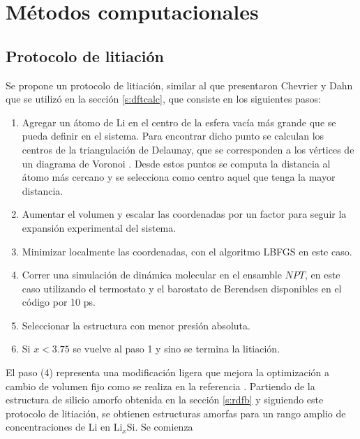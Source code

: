 \section{Métodos computacionales}

\subsection{Protocolo de litiación}\label{s:litpro}

Se propone un protocolo de litiación, similar al que presentaron Chevrier y Dahn
\cite{chevrier2009} que se utilizó en la sección \ref{s:dftcalc}, que consiste 
en los siguientes pasos:
\begin{enumerate}
    \item Agregar un átomo de Li en el centro de la esfera vacía más grande que se pueda definir en el sistema.
        Para encontrar dicho punto se calculan los centros de la triangulación 
        de Delaunay, que se corresponden a los vértices de un diagrama de 
        Voronoi \cite{aurenhammer1991}. Desde estos puntos se computa la 
        distancia al átomo más cercano y se selecciona como centro aquel que 
        tenga la mayor distancia. 
    \item Aumentar  el volumen y escalar las coordenadas por un factor para
        seguir la expansión experimental del sistema.
    \item Minimizar localmente las coordenadas, con el algoritmo LBFGS \cite{liu1989} en este caso.
    \item Correr una simulación de dinámica molecular en el ensamble $NPT$, en 
        este caso utilizando el termostato y el barostato de Berendsen \cite{berendsen1984} 
        disponibles en el código  \cite{dftb+} por 10 ps. 
    \item Seleccionar la estructura con menor presión absoluta.
    \item Si $x < 3.75$ se vuelve al paso 1 y sino se termina la litiación.
\end{enumerate}
El paso (4) representa una modificación ligera que mejora la optimización a 
cambio de volumen fijo como se realiza en la referencia \cite{chevrier2009}.
Partiendo de la estructura de silicio amorfo obtenida en la sección 
\ref{s:rdfb} y siguiendo este protocolo de litiación, se obtienen estructuras
amorfas para un rango amplio de concentraciones de Li en Li$_x$Si. Se comienza

